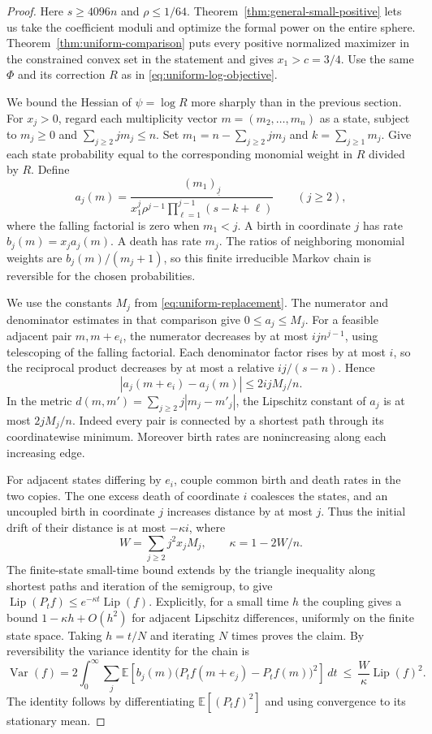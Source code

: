 \documentclass[11pt]{article}
\begin{document}
\begin{proof}
Here \(s\geq4096n\) and \(\rho\le1/64\).
Theorem~\ref{thm:general-small-positive} lets us take the
coefficient moduli and optimize the formal power on the entire
sphere. Theorem~\ref{thm:uniform-comparison} puts every positive
normalized maximizer in the constrained convex set in the
statement and gives \(x_1>c=3/4\).
Use the same \(\Phi\) and its correction \(R\) as in
\eqref{eq:uniform-log-objective}.

We bound the Hessian of \(\psi=\log R\) more sharply than
in the previous section. For \(x_j>0\), regard each
multiplicity vector \(m=(m_2,\ldots,m_n)\) as a state, subject
to \(m_j\geq0\) and \(\sum_{j\ge2}j m_j\leq n\).
Set \(m_1=n-\sum_{j\ge2}j m_j\) and \(k=\sum_{j\ge1}m_j\).
Give each state probability equal to the corresponding
monomial weight in \(R\) divided by \(R\). Define
\[
 a_j(m)=
 \frac{(m_1)_{\underline{j}}}
      {x_1^j\rho^{j-1}\prod_{\ell=1}^{j-1}(s-k+\ell)}
 \qquad (j\geq2),
\]
where the falling factorial is zero when \(m_1<j\).
A birth in coordinate \(j\) has rate \(b_j(m)=x_j a_j(m)\).
A death has rate \(m_j\). The ratios of neighboring
monomial weights are \(b_j(m)/(m_j+1)\), so this finite
irreducible Markov chain is reversible for the chosen
probabilities.

We use the constants \(M_j\) from
\eqref{eq:uniform-replacement}. The numerator and denominator
estimates in that comparison give \(0\leq a_j\leq M_j\).
For a feasible adjacent pair \(m,m+e_i\), the numerator
decreases by at most \(ij n^{j-1}\), using telescoping
of the falling factorial. Each denominator factor rises
by at most \(i\), so the reciprocal product decreases
by at most a relative \(ij/(s-n)\). Hence
\[
 |a_j(m+e_i)-a_j(m)|\leq 2ij M_j/n .
\]
In the metric \(d(m,m')=\sum_{j\ge2}j|m_j-m'_j|\), the
Lipschitz constant of \(a_j\) is at most \(2j M_j/n\).
Indeed every pair is connected by a shortest path through
its coordinatewise minimum. Moreover birth rates are
nonincreasing along each increasing edge.

For adjacent states differing by \(e_i\), couple common
birth and death rates in the two copies. The one excess
death of coordinate \(i\) coalesces the states, and an
uncoupled birth in coordinate \(j\) increases distance by
at most \(j\). Thus the initial drift of their distance is
at most \(-\kappa i\), where
\[
 W=\sum_{j\ge2}j^2x_jM_j,\qquad \kappa=1-2W/n.
\]
The finite-state small-time bound extends by the triangle
inequality along shortest paths and iteration of the
semigroup, to give
\(\operatorname{Lip}(P_tf)\leq e^{-\kappa t}\operatorname{Lip}(f)\).
Explicitly, for a small time \(h\) the coupling gives a bound
\(1-\kappa h+O(h^2)\) for adjacent Lipschitz differences,
uniformly on the finite state space. Taking \(h=t/N\)
and iterating \(N\) times proves the claim.
By reversibility the variance identity for the chain is
\[
 \operatorname{Var}(f)=2\int_0^\infty
     \sum_j\mathbb E\!\left[
       b_j(m)\big(P_tf(m+e_j)-P_tf(m)\big)^2
                      \right]\,dt
 \ \leq\ \frac{W}{\kappa}\operatorname{Lip}(f)^2 .
\]
The identity follows by differentiating
\(\mathbb E[(P_tf)^2]\) and using convergence to its
stationary mean.


\end{proof}
\end{document}
